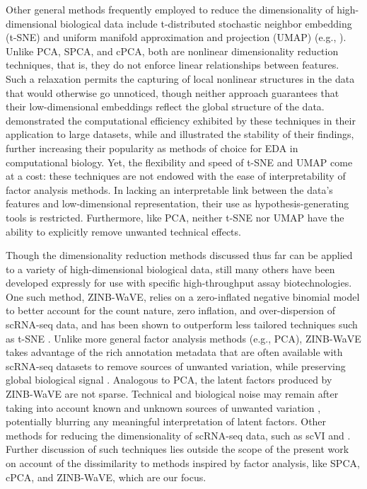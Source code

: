 Other general methods frequently employed to reduce the dimensionality of high-dimensional biological data include t-distributed stochastic neighbor embedding (t-SNE) \citep{Maaten08visualizingdata} and uniform manifold approximation and projection (UMAP) \citep{McInnes2018} (e.g., \citep{Amir2013, Becht2019}). Unlike PCA, SPCA, and cPCA, both are nonlinear dimensionality reduction techniques, that is, they do not enforce linear relationships between features. Such a relaxation permits the capturing of local nonlinear structures in the data that would otherwise go unnoticed, though neither approach guarantees that their low-dimensional embeddings reflect the global structure of the data. \citet{Becht2019} demonstrated the computational efficiency exhibited by these techniques in their application to large datasets, while \citet{Amir2013} and \citet{Becht2019} illustrated the stability of their findings, further increasing their popularity as methods of choice for EDA in computational biology. Yet, the flexibility and speed of t-SNE and UMAP come at a cost:  these techniques are not endowed with the ease of interpretability of factor analysis methods. In lacking an interpretable link between the data's features and low-dimensional representation, their use as hypothesis-generating tools is restricted. Furthermore, like PCA, neither t-SNE nor UMAP have the ability to explicitly remove unwanted technical effects. 

Though the dimensionality reduction methods discussed thus far can be applied to a variety of high-dimensional biological data, still many others have been developed expressly for use with specific high-throughput assay biotechnologies. One such method, ZINB-WaVE, relies on a zero-inflated negative binomial model to better account for the count nature, zero inflation, and over-dispersion of scRNA-seq data, and has been shown to outperform less tailored techniques such as t-SNE \citep{risso2017zinb}. Unlike more general factor analysis methods (e.g., PCA), ZINB-WaVE takes advantage of the rich annotation metadata that are often available with scRNA-seq datasets to remove sources of unwanted variation, while preserving global biological signal \citep{risso2017zinb}. Analogous to PCA, the latent factors produced by ZINB-WaVE are not sparse. Technical and biological noise may remain after taking into account known and unknown sources of unwanted variation \citep{risso2017zinb}, potentially blurring any meaningful interpretation of latent factors. Other methods for reducing the dimensionality of scRNA-seq data, such as scVI \citep{Lopez2018} and . Further discussion of such techniques lies outside the scope of the present work on account of the dissimilarity to methods inspired by factor analysis, like SPCA, cPCA, and ZINB-WaVE, which are our focus.